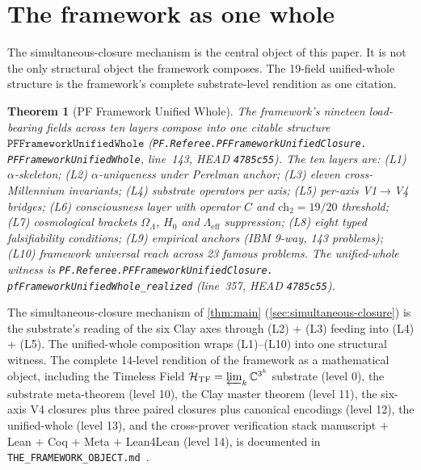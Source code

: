 \documentclass[11pt,a4paper]{article}
\theoremstyle{plain}
\newtheorem{theorem}{Theorem}[section]
\theoremstyle{definition}
\begin{document}
\section{The framework as one whole}
\label{sec:unified-whole}

The simultaneous-closure mechanism is the central object of this
paper. It is not the only structural object the framework composes.
The 19-field unified-whole structure is the framework's complete
substrate-level rendition as one citation.

\begin{theorem}[PF Framework Unified Whole]
\label{thm:unified-whole}
The framework's nineteen load-bearing fields across ten layers
compose into one citable structure
$\mathtt{PFFrameworkUnifiedWhole}$
(\texttt{PF.Referee.PFFrameworkUnifiedClosure.\\
PFFrameworkUnifiedWhole}, line~143, HEAD \texttt{4785c55}). The
ten layers are: (L1) $\alpha$-skeleton; (L2) $\alpha$-uniqueness
under Perelman anchor; (L3) eleven cross-Millennium invariants;
(L4) substrate operators per axis; (L5) per-axis V1$\to$V4
bridges; (L6) consciousness layer with operator $C$ and
$\mathrm{ch}_{2} = 19/20$ threshold; (L7) cosmological brackets
$\Omega_{\Lambda}$, $H_{0}$ and $\Lambda_{\mathrm{eff}}$
suppression; (L8) eight typed falsifiability conditions; (L9)
empirical anchors (IBM 9-way, 143 problems); (L10) framework
universal reach across 23 famous problems. The unified-whole
witness is
\texttt{PF.Referee.PFFrameworkUnifiedClosure.\\
pfFrameworkUnifiedWhole\_realized}
(line~357, HEAD \texttt{4785c55}).
\end{theorem}

The simultaneous-closure mechanism of \cref{thm:main}
(\cref{sec:simultaneous-closure}) is the substrate's reading of the
six Clay axes through (L2) + (L3) feeding into (L4) + (L5).
The unified-whole composition wraps (L1)--(L10) into one structural
witness. The complete 14-level rendition of the framework as a
mathematical object, including the Timeless Field
$\mathcal{H}_{\mathrm{TF}} = \varprojlim_{k} \mathbb{C}^{3^{k}}$
substrate (level 0), the substrate meta-theorem (level 10), the
Clay master theorem (level 11), the six-axis V4 closures plus
three paired closures plus canonical encodings (level 12), the
unified-whole (level 13), and the cross-prover verification stack
manuscript $+$ Lean $+$ Coq $+$ Meta $+$ Lean4Lean (level 14), is
documented in \texttt{THE\_FRAMEWORK\_OBJECT.md}~\cite{framework_object}.
\end{document}
